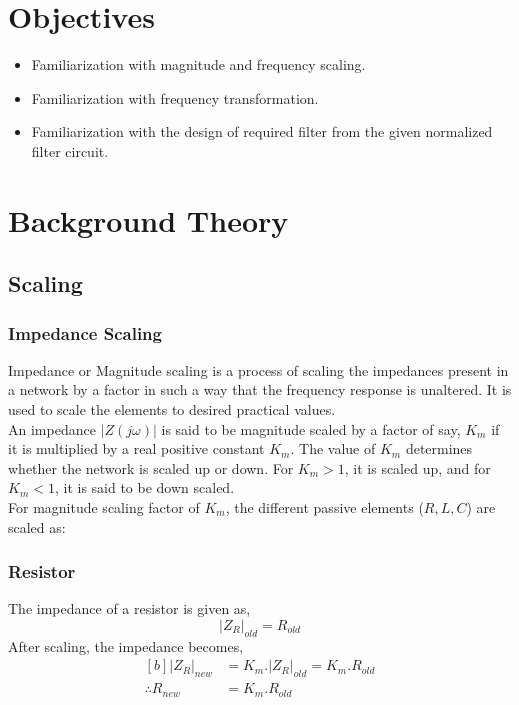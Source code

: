 \documentclass{lab_sheet}
\begin{document}
\clearpage
\tableofcontents
\clearpage
{}
{}
\listoffigures
\clearpage
{}
\section{Objectives}
\begin{itemize}
	\item Familiarization with magnitude and frequency scaling.
	\item Familiarization with frequency transformation.
	\item Familiarization with the design of required filter from the given normalized filter circuit.
\end{itemize}

\section{Background Theory}
\subsection{Scaling}
\subsubsection{Impedance Scaling}
Impedance or Magnitude scaling is a process of scaling the impedances present in a network by a factor in such a way that the frequency response is unaltered. It is used to scale the elements to desired practical values. \\
An impedance $|Z(j\omega)|$ is said to be magnitude scaled by a factor of say, $K_m$ if it is multiplied by a real positive constant $K_m$. The value of $K_m$ determines whether the network is scaled up or down. For $K_m>1$, it is scaled up, and for $K_m<1$, it is said to be down scaled.
\\For magnitude scaling factor of $K_m$, the different passive elements ($R, L, C$) are scaled as:
\subsubsection*{Resistor}
The impedance of a resistor is given as, 
$$
|Z_R|_{old}=R_{old}
$$
After scaling, the impedance becomes,
\begin{equation}
   \begin{aligned}[b]
      |Z_R|_{new}&=K_m.|Z_R|_{old}=K_m.R_{old}\\
      \therefore R_{new}&=K_m.R_{old}
   \end{aligned}
   \label{eqn:r_mag}
\end{equation}
\end{document}
